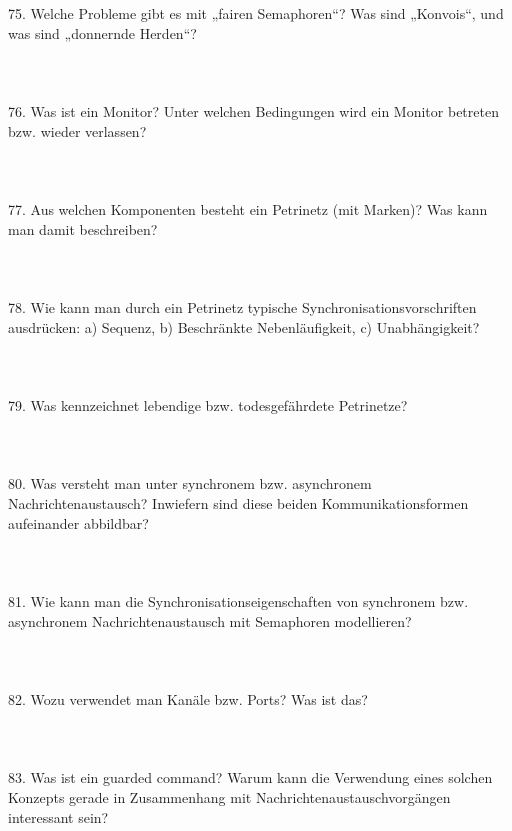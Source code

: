 \documentclass{article}
\begin{document}
\\
\\
75. Welche Probleme gibt es mit „fairen Semaphoren“? Was sind „Konvois“, und was sind
„donnernde Herden“?
\\
\\
\\
\\
76. Was ist ein Monitor? Unter welchen Bedingungen wird ein Monitor betreten bzw. wieder
verlassen?
\\
\\
\\
\\
77. Aus welchen Komponenten besteht ein Petrinetz (mit Marken)? Was kann man damit
beschreiben?
\\
\\
\\
\\
78. Wie kann man durch ein Petrinetz typische Synchronisationsvorschriften ausdrücken:
a) Sequenz,
b) Beschränkte Nebenläufigkeit,
c) Unabhängigkeit?
\\
\\
\\
\\
79. Was kennzeichnet lebendige bzw. todesgefährdete Petrinetze?
\\
\\
\\
\\
80. Was versteht man unter synchronem bzw. asynchronem Nachrichtenaustausch? Inwiefern
sind diese beiden Kommunikationsformen aufeinander abbildbar?
\\
\\
\\
\\
81. Wie kann man die Synchronisationseigenschaften von synchronem bzw. asynchronem
Nachrichtenaustausch mit Semaphoren modellieren?
\\
\\
\\
\\
82. Wozu verwendet man Kanäle bzw. Ports? Was ist das?
\\
\\
\\
\\
83. Was ist ein guarded command? Warum kann die Verwendung eines solchen Konzepts gerade
in Zusammenhang mit Nachrichtenaustauschvorgängen interessant sein?
\\
\\
\\
\end{document}
